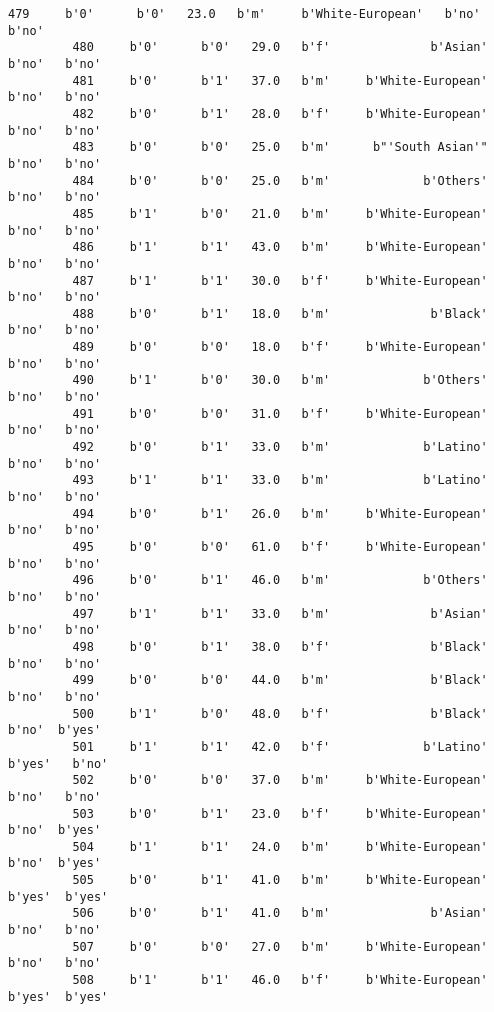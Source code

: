 \documentclass[11pt]{article}
\begin{document}
\begin{Verbatim}[commandchars=\\\{\}]
         479     b'0'      b'0'   23.0   b'm'     b'White-European'   b'no'   b'no'   
         480     b'0'      b'0'   29.0   b'f'              b'Asian'   b'no'   b'no'   
         481     b'0'      b'1'   37.0   b'm'     b'White-European'   b'no'   b'no'   
         482     b'0'      b'1'   28.0   b'f'     b'White-European'   b'no'   b'no'   
         483     b'0'      b'0'   25.0   b'm'      b"'South Asian'"   b'no'   b'no'   
         484     b'0'      b'0'   25.0   b'm'             b'Others'   b'no'   b'no'   
         485     b'1'      b'0'   21.0   b'm'     b'White-European'   b'no'   b'no'   
         486     b'1'      b'1'   43.0   b'm'     b'White-European'   b'no'   b'no'   
         487     b'1'      b'1'   30.0   b'f'     b'White-European'   b'no'   b'no'   
         488     b'0'      b'1'   18.0   b'm'              b'Black'   b'no'   b'no'   
         489     b'0'      b'0'   18.0   b'f'     b'White-European'   b'no'   b'no'   
         490     b'1'      b'0'   30.0   b'm'             b'Others'   b'no'   b'no'   
         491     b'0'      b'0'   31.0   b'f'     b'White-European'   b'no'   b'no'   
         492     b'0'      b'1'   33.0   b'm'             b'Latino'   b'no'   b'no'   
         493     b'1'      b'1'   33.0   b'm'             b'Latino'   b'no'   b'no'   
         494     b'0'      b'1'   26.0   b'm'     b'White-European'   b'no'   b'no'   
         495     b'0'      b'0'   61.0   b'f'     b'White-European'   b'no'   b'no'   
         496     b'0'      b'1'   46.0   b'm'             b'Others'   b'no'   b'no'   
         497     b'1'      b'1'   33.0   b'm'              b'Asian'   b'no'   b'no'   
         498     b'0'      b'1'   38.0   b'f'              b'Black'   b'no'   b'no'   
         499     b'0'      b'0'   44.0   b'm'              b'Black'   b'no'   b'no'   
         500     b'1'      b'0'   48.0   b'f'              b'Black'   b'no'  b'yes'   
         501     b'1'      b'1'   42.0   b'f'             b'Latino'  b'yes'   b'no'   
         502     b'0'      b'0'   37.0   b'm'     b'White-European'   b'no'   b'no'   
         503     b'0'      b'1'   23.0   b'f'     b'White-European'   b'no'  b'yes'   
         504     b'1'      b'1'   24.0   b'm'     b'White-European'   b'no'  b'yes'   
         505     b'0'      b'1'   41.0   b'm'     b'White-European'  b'yes'  b'yes'   
         506     b'0'      b'1'   41.0   b'm'              b'Asian'   b'no'   b'no'   
         507     b'0'      b'0'   27.0   b'm'     b'White-European'   b'no'   b'no'   
         508     b'1'      b'1'   46.0   b'f'     b'White-European'  b'yes'  b'yes'   

\end{Verbatim}
\end{document}
